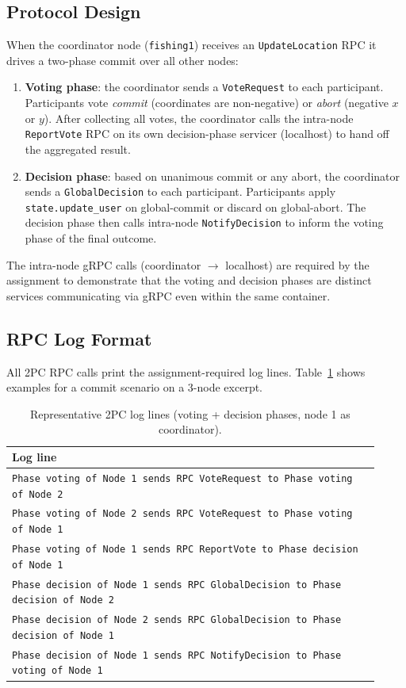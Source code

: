 \documentclass[11pt]{article}
\newcommand{\rpc}[1]{\texttt{#1}}
\begin{document}
\subsection{Protocol Design}

When the coordinator node (\texttt{fishing1}) receives an \rpc{UpdateLocation} RPC it
drives a two-phase commit over all other nodes:

\begin{enumerate}
  \item \textbf{Voting phase}: the coordinator sends a \rpc{VoteRequest} to each participant.
    Participants vote \emph{commit} (coordinates are non-negative) or \emph{abort}
    (negative $x$ or $y$).  After collecting all votes, the coordinator calls the
    intra-node \rpc{ReportVote} RPC on its own decision-phase servicer (localhost) to
    hand off the aggregated result.
  \item \textbf{Decision phase}: based on unanimous commit or any abort, the coordinator
    sends a \rpc{GlobalDecision} to each participant.  Participants apply
    \texttt{state.update\_user} on global-commit or discard on global-abort.
    The decision phase then calls intra-node \rpc{NotifyDecision} to inform the voting
    phase of the final outcome.
\end{enumerate}

The intra-node gRPC calls (coordinator $\rightarrow$ localhost) are required by the
assignment to demonstrate that the voting and decision phases are distinct services
communicating via gRPC even within the same container.

\subsection{RPC Log Format}

All 2PC RPC calls print the assignment-required log lines.
Table~\ref{tab:2pc-log} shows examples for a commit scenario on a 3-node excerpt.

\begin{table}[H]
\centering
\caption{Representative 2PC log lines (voting + decision phases, node 1 as coordinator).}
\label{tab:2pc-log}
\begin{tabular}{p{0.92\linewidth}}
\toprule
\textbf{Log line} \\
\midrule
\lstinline|Phase voting of Node 1 sends RPC VoteRequest to Phase voting of Node 2| \\
\lstinline|Phase voting of Node 2 sends RPC VoteRequest to Phase voting of Node 1| \\
\lstinline|Phase voting of Node 1 sends RPC ReportVote to Phase decision of Node 1| \\
\lstinline|Phase decision of Node 1 sends RPC GlobalDecision to Phase decision of Node 2| \\
\lstinline|Phase decision of Node 2 sends RPC GlobalDecision to Phase decision of Node 1| \\
\lstinline|Phase decision of Node 1 sends RPC NotifyDecision to Phase voting of Node 1| \\
\bottomrule
\end{tabular}
\end{table}
\end{document}
